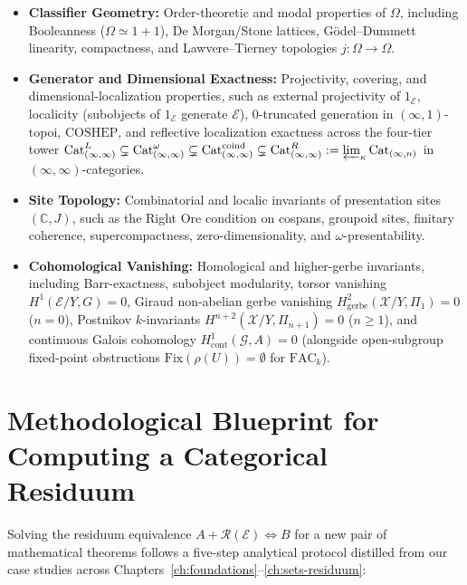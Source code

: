 \begin{itemize}

  \item \textbf{Classifier Geometry:} Order-theoretic and modal properties of $\Omega$, including Booleanness ($\Omega \simeq 1+1$), De Morgan/Stone lattices, Gödel--Dummett linearity, compactness, and Lawvere--Tierney topologies $j: \Omega \to \Omega$.

  \item \textbf{Generator and Dimensional Exactness:} Projectivity, covering, and dimensional-localization properties, such as external projectivity of $1_{\mathcal{E}}$, localicity (subobjects of $1_{\mathcal{E}}$ generate $\mathcal{E}$), $0$-truncated generation in $(\infty, 1)$-topoi, $\mathrm{COSHEP}$, and reflective localization exactness across the four-tier tower $\mathrm{Cat}^L_{(\infty, \infty)} \subsetneq \mathrm{Cat}^\omega_{(\infty, \infty)} \subsetneq \mathrm{Cat}^{\mathrm{coind}}_{(\infty, \infty)} \subsetneq \mathrm{Cat}^R_{(\infty, \infty)} := \varprojlim_\kappa \mathrm{Cat}_{(\infty, n)}$ in $(\infty, \infty)$-categories.

  \item \textbf{Site Topology:} Combinatorial and localic invariants of presentation sites $(\mathbb{C}, J)$, such as the Right Ore condition on cospans, groupoid sites, finitary coherence, supercompactness, zero-dimensionality, and $\omega$-presentability.

  \item \textbf{Cohomological Vanishing:} Homological and higher-gerbe invariants, including Barr-exactness, subobject modularity, torsor vanishing $H^1(\mathcal{E}/Y, G) = 0$, Giraud non-abelian gerbe vanishing $H^2_{\mathrm{gerbe}}(\mathcal{X}/Y, \Pi_1) = 0$ ($n = 0$), Postnikov $k$-invariants $H^{n+2}(\mathcal{X}/Y, \Pi_{n+1}) = 0$ ($n \ge 1$), and continuous Galois cohomology $H^1_{\mathrm{cont}}(\mathcal{G}, A) = 0$ (alongside open-subgroup fixed-point obstructions $\mathrm{Fix}(\rho(U)) = \emptyset$ for $\mathrm{FAC}_k$).

\end{itemize}

\section{Methodological Blueprint for Computing a Categorical Residuum}

Solving the residuum equivalence $A + \mathcal{R}(\mathcal{E}) \iff B$ for a new pair of mathematical theorems follows a five-step analytical protocol distilled from our case studies across Chapters~\ref{ch:foundations}--\ref{ch:sets-residuum}:


